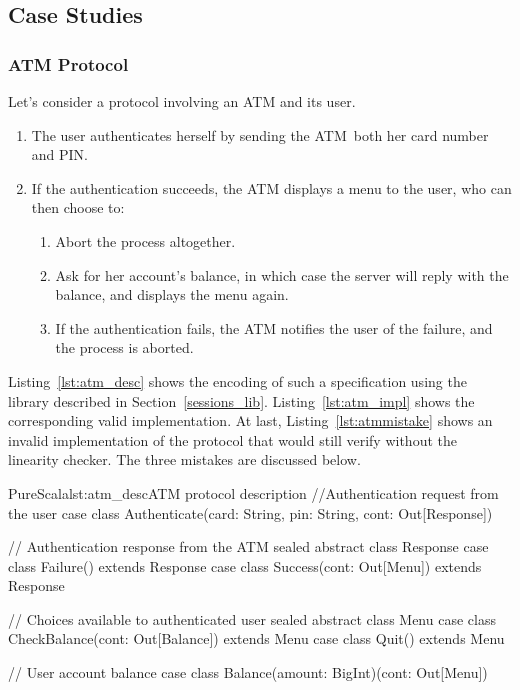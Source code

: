 \documentclass[a4paper,twoside]{article}
\newcommand{\RefSec}[1]{Section~\ref{#1}}
\newcommand{\RefCode}[1]{Listing~\ref{#1}}
\begin{document}
\subsection{Case Studies}

\subsubsection{ATM Protocol}

Let's consider a protocol involving an ATM and its user.

\begin{enumerate}
\item The user authenticates herself by sending the ATM both her card number and PIN.
\item If the authentication succeeds, the ATM displays a menu to the user, who can then choose to:
\begin{enumerate}
\item Abort the process altogether.
\item Ask for her account's balance, in which case the server will reply with the balance, and displays the menu again.
\item If the authentication fails, the ATM notifies the user of the failure, and the process is aborted.
\end{enumerate}
\end{enumerate}

\RefCode{lst:atm_desc} shows the encoding of such a specification using the library described in \RefSec{sessions_lib}. \RefCode{lst:atm_impl} shows the corresponding valid implementation. At last, \RefCode{lst:atmmistake} shows an invalid implementation of the protocol that would still verify without the linearity checker. The three mistakes are discussed below.

\begin{Code}{PureScala}{lst:atm_desc}{ATM protocol description}
//Authentication request from the user
case class Authenticate(card: String, pin: String, cont: Out[Response])

// Authentication response from the ATM
sealed abstract class Response
case class Failure()                extends Response
case class Success(cont: Out[Menu]) extends Response

// Choices available to authenticated user
sealed abstract class Menu
case class CheckBalance(cont: Out[Balance]) extends Menu
case class Quit()                           extends Menu

// User account balance
case class Balance(amount: BigInt)(cont: Out[Menu])
\end{Code}
\end{document}
